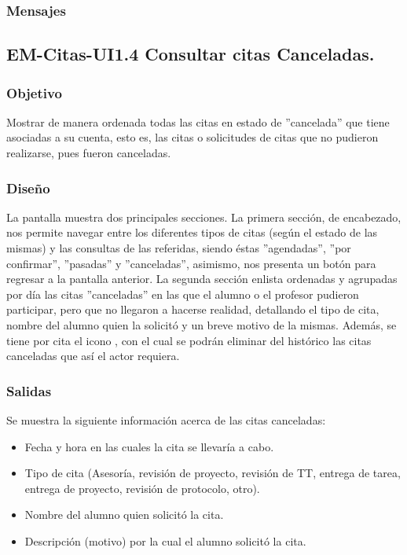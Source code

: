 \subsubsection{Mensajes}
	\begin{Citemize}
		\item {}
	\end{Citemize}


\pagebreak

\subsection{EM-Citas-UI1.4 Consultar citas Canceladas.}

\subsubsection{Objetivo}
	\noindent
	Mostrar de manera ordenada todas las citas en estado de ''cancelada'' que tiene asociadas a su cuenta, esto es, las citas o solicitudes de citas que no pudieron realizarse, pues fueron canceladas.

\subsubsection{Diseño}
	\noindent
	La pantalla muestra dos principales secciones. La primera sección, de encabezado, nos permite navegar entre los diferentes tipos de citas (según el estado de las mismas) y las consultas de las referidas, siendo éstas ''agendadas'', ''por confirmar'', ''pasadas'' y ''canceladas'', asimismo, nos presenta un botón para regresar a la pantalla anterior.
	\newline
	La segunda sección enlista ordenadas y agrupadas por día las citas ''canceladas'' en las que el alumno o el profesor pudieron participar, pero que no llegaron a hacerse realidad, detallando el tipo de cita, nombre del alumno quien la solicitó y un breve motivo de la mismas. Además, se tiene por cita el icono , con el cual se podrán eliminar del histórico las citas canceladas que así el actor requiera.

\pagebreak
{}

\subsubsection{Salidas}
	\noindent
	Se muestra la siguiente información acerca de las citas canceladas:
		\begin{itemize}
			\item Fecha y hora en las cuales la cita se llevaría a cabo.
			\item Tipo de cita (Asesoría, revisión de proyecto, revisión de TT, entrega de tarea, entrega de proyecto, revisión de protocolo, otro).
			\item Nombre del alumno quien solicitó la cita.
			\item Descripción (motivo) por la cual el alumno solicitó la cita.
		\end{itemize}

